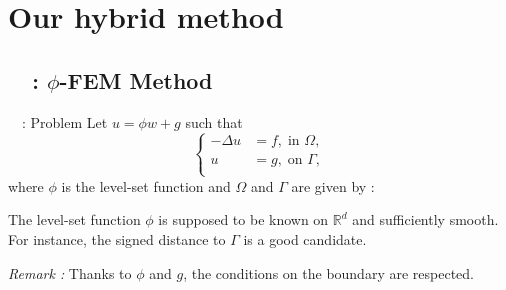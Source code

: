 \section{Our hybrid method}

\subsection{\appendixname~\theappendixframenumber~: $\phi$-FEM Method}

\begin{frame}{\appendixname~\theappendixframenumber~: Problem}
	Let $u=\phi w+g$ such that
	$$\left\{\begin{aligned}
		-\Delta u &= f, \; \text{in } \Omega, \\
		u&=g, \; \text{on } \Gamma, \\
	\end{aligned}\right.$$
	where $\phi$ is the level-set function and $\Omega$ and $\Gamma$ are given by :
	\begin{center}
	\end{center}
	The level-set function $\phi$ is supposed to be known on $\mathbb{R}^d$ and sufficiently smooth. \\
	For instance, the signed distance to $\Gamma$ is a good candidate.
	
	\vspace{5pt}
	
	\footnotesize
	\textit{Remark :} Thanks to $\phi$ and $g$, the conditions on the boundary are respected.
\end{frame}

